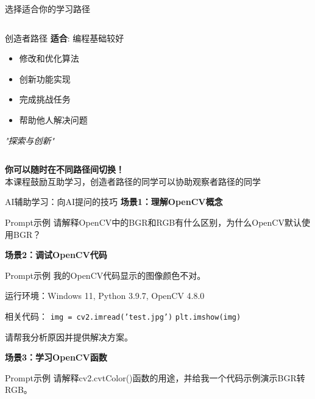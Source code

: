 \begin{frame}{选择适合你的学习路径}
\begin{columns}[t]
        \begin{block}{创造者路径}
            \textbf{适合}: 编程基础较好
            \vspace{0.2cm}
            \begin{itemize}
                \small
                \item 修改和优化算法
                \item 创新功能实现
                \item 完成挑战任务
                \item 帮助他人解决问题
            \end{itemize}
            \vspace{0.2cm}
            \centering
            \textit{"探索与创新"}
        \end{block}
    \end{columns}

    \vspace{0.5cm}
    \begin{center}
        \textbf{你可以随时在不同路径间切换！}\\
        \small 本课程鼓励互助学习，创造者路径的同学可以协助观察者路径的同学
    \end{center}
\end{frame}

\begin{frame}{AI辅助学习：向AI提问的技巧}
    \textbf{场景1：理解OpenCV概念}
    \begin{exampleblock}{Prompt示例}
        请解释OpenCV中的BGR和RGB有什么区别，为什么OpenCV默认使用BGR？
    \end{exampleblock}

    \vspace{0.3cm}

    \textbf{场景2：调试OpenCV代码}
    \begin{exampleblock}{Prompt示例}
        我的OpenCV代码显示的图像颜色不对。

        运行环境：Windows 11, Python 3.9.7, OpenCV 4.8.0

        相关代码：
        \texttt{img = cv2.imread('test.jpg')}
        \texttt{plt.imshow(img)}

        请帮我分析原因并提供解决方案。
    \end{exampleblock}

    \vspace{0.3cm}

    \textbf{场景3：学习OpenCV函数}
    \begin{exampleblock}{Prompt示例}
        请解释cv2.cvtColor()函数的用途，并给我一个代码示例演示BGR转RGB。
    \end{exampleblock}
\end{frame}

